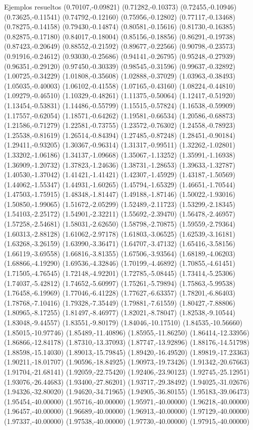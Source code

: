 \documentclass[11pt,a4paper]{article}
\begin{document}
\begin{fmex}{Ejemplos resueltos}
(0.70107,-0.09821) (0.71282,-0.10373) (0.72455,-0.10946) (0.73625,-0.11541) (0.74792,-0.12160) (0.75956,-0.12802) (0.77117,-0.13468) (0.78275,-0.14158) (0.79430,-0.14874) (0.80581,-0.15616) (0.81730,-0.16385) (0.82875,-0.17180) (0.84017,-0.18004) (0.85156,-0.18856) (0.86291,-0.19738) (0.87423,-0.20649) (0.88552,-0.21592) (0.89677,-0.22566) (0.90798,-0.23573) (0.91916,-0.24612) (0.93030,-0.25686) (0.94141,-0.26795) (0.95248,-0.27939) (0.96351,-0.29120) (0.97450,-0.30339) (0.98545,-0.31596) (0.99637,-0.32892) (1.00725,-0.34229) (1.01808,-0.35608) (1.02888,-0.37029) (1.03963,-0.38493) (1.05035,-0.40003) (1.06102,-0.41558) (1.07165,-0.43160) (1.08224,-0.44810) (1.09279,-0.46510) (1.10329,-0.48261) (1.11375,-0.50064) (1.12417,-0.51920) (1.13454,-0.53831) (1.14486,-0.55799) (1.15515,-0.57824) (1.16538,-0.59909) (1.17557,-0.62054) (1.18571,-0.64262) (1.19581,-0.66534) (1.20586,-0.68873) (1.21586,-0.71279) (1.22581,-0.73755) (1.23572,-0.76302) (1.24558,-0.78923) (1.25538,-0.81619) (1.26514,-0.84394) (1.27485,-0.87248) (1.28451,-0.90184) (1.29411,-0.93205) (1.30367,-0.96314) (1.31317,-0.99511) (1.32262,-1.02801) (1.33202,-1.06186) (1.34137,-1.09668) (1.35067,-1.13252) (1.35991,-1.16938) (1.36909,-1.20732) (1.37823,-1.24636) (1.38731,-1.28653) (1.39633,-1.32787) (1.40530,-1.37042) (1.41421,-1.41421) (1.42307,-1.45929) (1.43187,-1.50569) (1.44062,-1.55347) (1.44931,-1.60265) (1.45794,-1.65329) (1.46651,-1.70544) (1.47503,-1.75915) (1.48348,-1.81447) (1.49188,-1.87146) (1.50022,-1.93016) (1.50850,-1.99065) (1.51672,-2.05299) (1.52489,-2.11723) (1.53299,-2.18345) (1.54103,-2.25172) (1.54901,-2.32211) (1.55692,-2.39470) (1.56478,-2.46957) (1.57258,-2.54681) (1.58031,-2.62650) (1.58798,-2.70875) (1.59559,-2.79364) (1.60313,-2.88128) (1.61062,-2.97178) (1.61803,-3.06525) (1.62539,-3.16181) (1.63268,-3.26159) (1.63990,-3.36471) (1.64707,-3.47132) (1.65416,-3.58156) (1.66119,-3.69558) (1.66816,-3.81355) (1.67506,-3.93564) (1.68189,-4.06203) (1.68866,-4.19290) (1.69536,-4.32846) (1.70199,-4.46892) (1.70855,-4.61451) (1.71505,-4.76545) (1.72148,-4.92201) (1.72785,-5.08445) (1.73414,-5.25306) (1.74037,-5.42812) (1.74652,-5.60997) (1.75261,-5.79894) (1.75863,-5.99538) (1.76458,-6.19969) (1.77046,-6.41228) (1.77627,-6.63357) (1.78201,-6.86403) (1.78768,-7.10416) (1.79328,-7.35449) (1.79881,-7.61559) (1.80427,-7.88806) (1.80965,-8.17255) (1.81497,-8.46977) (1.82021,-8.78047) (1.82538,-9.10544) (1.83048,-9.44557) (1.83551,-9.80179) (1.84046,-10.17510) (1.84535,-10.56660) (1.85015,-10.97746) (1.85489,-11.40896) (1.85955,-11.86250) (1.86414,-12.33956) (1.86866,-12.84178) (1.87310,-13.37093) (1.87747,-13.92896) (1.88176,-14.51798) (1.88598,-15.14030) (1.89013,-15.79845) (1.89420,-16.49520) (1.89819,-17.23363) (1.90211,-18.01707) (1.90596,-18.84925) (1.90973,-19.73426) (1.91342,-20.67663) (1.91704,-21.68141) (1.92059,-22.75420) (1.92406,-23.90123) (1.92745,-25.12951) (1.93076,-26.44683) (1.93400,-27.86201) (1.93717,-29.38492) (1.94025,-31.02676) (1.94326,-32.80020) (1.94620,-34.71965) (1.94905,-36.80155) (1.95183,-39.06473) (1.95454,-40.00000) (1.95716,-40.00000) (1.95971,-40.00000) (1.96218,-40.00000) (1.96457,-40.00000) (1.96689,-40.00000) (1.96913,-40.00000) (1.97129,-40.00000) (1.97337,-40.00000) (1.97538,-40.00000) (1.97730,-40.00000) (1.97915,-40.00000) 
\end{fmex}
\end{document}
